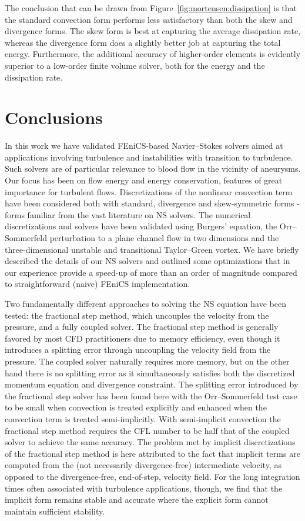 The conclusion that can be drawn from
Figure~\ref{fig:mortensen:dissipation} is that the standard convection
form performs less satisfactory than both the skew and divergence
forms. The skew form is best at capturing the average dissipation rate,
whereas the divergence form does a slightly better job at capturing the
total energy. Furthermore, the additional accuracy of
higher-order elements is evidently superior to a low-order finite volume
solver, both for the energy and the dissipation rate.

\section{Conclusions}

In this work we have validated FEniCS-based Navier--Stokes solvers
aimed at applications involving turbulence and instabilities with
transition to turbulence. Such solvers are of particular relevance
to blood flow in the vicinity of aneurysms.  Our focus has been on
flow energy and energy conservation, features of great importance for
turbulent flows. Discretizations of the nonlinear convection term have
been considered both with standard, divergence and skew-symmetric forms
- forms familiar from the vast literature on NS solvers. The numerical
discretizations and solvers have been validated using Burgers' equation,
the Orr--Sommerfeld perturbation to a plane channel flow in two dimensions
and the three-dimensional unstable and transitional Taylor--Green
vortex. We have briefly described the details of our NS solvers and
outlined some optimizations that in our experience provide a speed-up
of more than an order of magnitude compared to straightforward (naive)
FEniCS implementation.

Two fundamentally different approaches to solving the NS equation have
been tested: the fractional step method, which uncouples the velocity from
the pressure, and a fully coupled solver. The fractional step method is
generally favored by most CFD practitioners due to memory efficiency,
even though it introduces a splitting error through uncoupling the
velocity field from the pressure. The coupled solver naturally requires
more memory, but on the other hand there is no splitting error as it
simultaneously satisfies both the discretized momentum equation and
divergence constraint.  The splitting error introduced by the fractional
step solver has been found here with the Orr--Sommerfeld test case to
be small when convection is treated explicitly and enhanced when the
convection term is treated semi-implicitly. With semi-implicit convection
the fractional step method requires the CFL number to be half that of
the coupled solver to achieve the same accuracy. The problem met by
implicit discretizations of the fractional step method
is here attributed to the fact that implicit terms are computed from the
(not necessarily divergence-free) intermediate velocity, as opposed to
the divergence-free, end-of-step, velocity field.
For the long integration times often associated with turbulence
applications, though, we find that the implicit form remains stable and
accurate where the explicit form cannot maintain sufficient stability.

